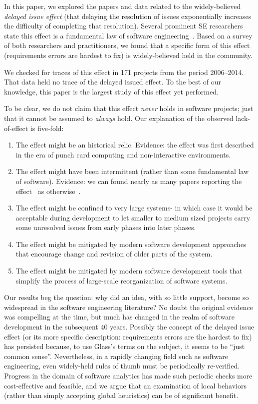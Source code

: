 \documentclass{sig-alternate}
\newcommand{\be}{\begin{enumerate}}
\newcommand{\ee}{\end{enumerate}}
\begin{document}
In this paper, we explored   the papers and data related to the 
widely-believed {\em delayed issue effect} (that delaying the resolution of issues
exponentially 
increases the difficulty of completing that  resolution).
Several prominent SE researchers state this effect is a fundamental law of software engineering~\cite{boehm01,mcconnell01,boehm01,glass02}.
Based on a  survey  of both researchers and practitioners, we  found that
a specific form  of this effect (requirements errors are hardest to fix) is  widely-believed
held in the community.  

We checked for traces of this effect in 171 projects from the period 2006--2014.
That data held no trace of the delayed issued effect.
To the best of our knowledge, this paper is the  largest study
of this effect yet performed.

To be clear, we do not claim that this effect {\em never} holds in software projects; just that it cannot be assumed to {\em always} hold. Our explanation of the observed lack-of-effect is five-fold:
\be
\item The effect might be an historical relic. Evidence:
the effect was first described in the era of punch card computing and non-interactive environments.
\item The effect might have been intermittent (rather than some fundamental law of software). Evidence: we can  found nearly
as many papers reporting the effect~\cite{Boehm76,Boehm81,steck04,Fagan76,Stephenson76} as otherwise~\cite{Royce98,Boehm80,Shull02}.
\item The effect might be confined to very large systems- in which case it would be
acceptable during development to let smaller to medium
sized projects carry some unresolved issues from early phases into later phases.
\item The effect might be mitigated by modern software development approaches that
encourage change and revision of older parts of the system.
\item The effect might be mitigated by modern software development tools
that simplify the process of large-scale reorganization of software systems.
\ee
Our results beg the question: why did an idea, with so little support, become so widespread in the software engineering literature? No doubt the original evidence was compelling at the time, but much has changed in the realm of software development in the subsequent 40 years. Possibly the concept of the delayed issue effect (or its more specific description: requirements errors are the hardest to fix)
has persisted because, to use Glass's terms on the subject, it seems to be ``just common sense''\cite{glass02}. 
Nevertheless, in a rapidly changing field such as software engineering, even widely-held rules of thumb must be periodically re-verified. 
Progress in the domain of software analytics has made such periodic checks more cost-effective and feasible, and we argue that an examination of local behaviors (rather than simply accepting global heuristics) can be of significant benefit.
\end{document}
